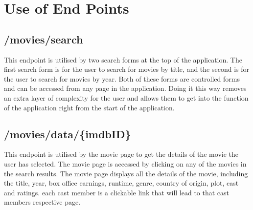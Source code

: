 \documentclass[12pt,a4paper]{article}
\begin{document}
	\newpage

	\section{Use of End Points}
		\subsection{/movies/search}
			This endpoint is utilised by two search forms at the top of the application. The first 
			search form is for the user to search for movies by title, and the second is for the user 
			to search for movies by year. Both of these forms are controlled forms and can be accessed 
			from any page in the application. Doing it this way removes an extra layer of complexity for 
			the user and allows them to get into the function of the application right from the start of
			the application.\\

			\begin{center}
			\end{center}

		\newpage

		\subsection{/movies/data/\{imdbID\}}
			This endpoint is utilised by the movie page to get the details of the movie the user has 
			selected. The movie page is accessed by clicking on any of the movies in the search results. 
			The movie page displays all the details of the movie, including the title, year, box office 
			earnings, runtime, genre, country of origin, plot, cast and ratings. each cast member is a 
			clickable link that will lead to that cast members respective page.\\
\end{document}

